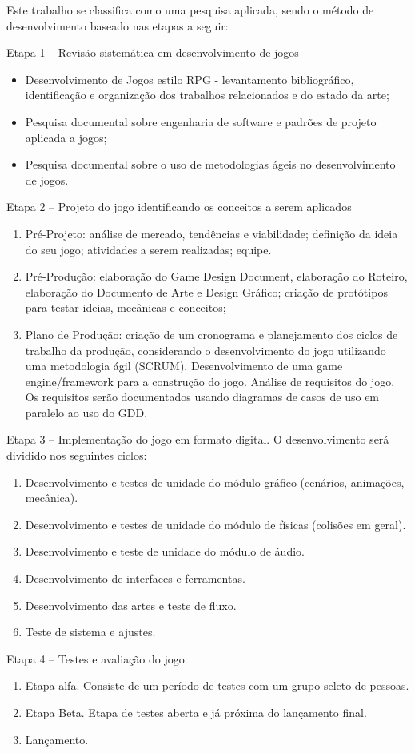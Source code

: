 \documentclass[12pt, 
openright, 
oneside, 
a4paper,    
brazil]{facom-ufu-abntex2}
\begin{document}
Este trabalho se classifica como uma pesquisa aplicada, sendo o método de desenvolvimento baseado nas etapas a seguir:

Etapa 1 – Revisão sistemática em desenvolvimento de jogos
\begin{itemize}
\item Desenvolvimento de Jogos estilo RPG - levantamento bibliográfico, identificação e organização dos trabalhos relacionados e do estado da arte;
\item Pesquisa documental sobre engenharia de software e padrões de projeto aplicada a jogos;
\item Pesquisa documental sobre o uso de metodologias ágeis no desenvolvimento de jogos.
\end{itemize}

Etapa 2 – Projeto do jogo identificando os conceitos a serem aplicados 
\begin{enumerate}
\item Pré-Projeto: análise de mercado, tendências e viabilidade;
definição da ideia do seu jogo; atividades a serem realizadas;
equipe.
\item Pré-Produção: elaboração do Game Design Document, elaboração do Roteiro, elaboração do Documento de Arte e Design Gráfico; criação de protótipos para testar ideias, mecânicas e conceitos;
\item Plano de Produção: criação de um cronograma e planejamento dos ciclos de trabalho da produção, considerando o desenvolvimento do jogo utilizando uma  metodologia ágil (SCRUM). Desenvolvimento de uma game engine/framework para a construção do jogo. Análise de requisitos do jogo. Os requisitos serão documentados usando diagramas de casos de uso em paralelo ao uso do GDD.
\end{enumerate}

Etapa 3 – Implementação do jogo em formato digital. O desenvolvimento será dividido nos seguintes ciclos:
\begin{enumerate}
\item Desenvolvimento e testes de unidade do módulo gráfico
(cenários, animações, mecânica).
\item Desenvolvimento e testes de unidade do módulo de físicas
(colisões em geral).
\item Desenvolvimento e teste de unidade do módulo de áudio.
\item Desenvolvimento de interfaces e ferramentas.
\item Desenvolvimento das artes e teste de fluxo.
\item Teste de sistema e ajustes.
\end{enumerate}
Etapa 4 – Testes e avaliação do jogo.
\begin{enumerate}
\item Etapa alfa. Consiste de um período de testes com um grupo seleto de pessoas.
\item Etapa Beta. Etapa de testes aberta e já próxima do lançamento final.
\item Lançamento.
\end{enumerate}
\fi
\end{document}
